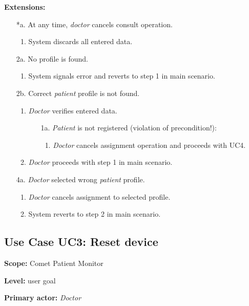 \documentclass[fontsize=12pt,
               paper=a4,
               twoside=false,
               parskip=half,
               ]{scrartcl}
\begin{document}
\textbf{\textsf{Extensions:}}

\begin{itemize}[leftmargin=3em]
	\item[*a.] At any time, \emph{doctor} cancels consult operation.
	\begin{enumerate}
		\item System discards all entered data.
	\end{enumerate}
	\item[2a.] No profile is found.
	\begin{enumerate}
		\item System signals error and reverts to step 1 in main scenario.
	\end{enumerate}
	\item[2b.] Correct \emph{patient} profile is not found.
	\begin{enumerate}
		\item \emph{Doctor} verifies entered data.
		\begin{itemize}
			\item[1a.] \emph{Patient} is not registered (violation of precondition!):
			\begin{enumerate}[label=\arabic*.]
				\item \emph{Doctor} cancels assignment operation and proceeds with UC4.
			\end{enumerate}
		\end{itemize}
		\item \emph{Doctor} proceeds with step 1 in main scenario.
	\end{enumerate}
	\item[4a.] \emph{Doctor} selected wrong \emph{patient} profile.
	\begin{enumerate}
		\item \emph{Doctor} cancels assignment to selected profile.
		\item System reverts to step 2 in main scenario.
	\end{enumerate}
\end{itemize}


\subsection{Use Case UC3: Reset device}

\textbf{\textsf{Scope:}} Comet Patient Monitor

\textbf{\textsf{Level:}} user goal

\textbf{\textsf{Primary actor:}} \emph{Doctor}
\end{document}
